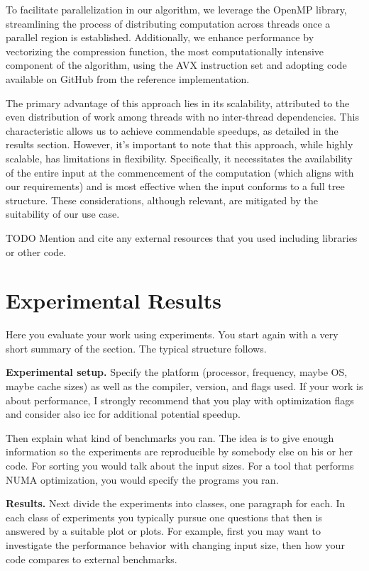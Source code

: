 \documentclass[letterpaper]{article}
\newcommand{\mypar}[1]{{\bf #1.}}
\begin{document}
To facilitate parallelization in our algorithm, we leverage the OpenMP library, streamlining the process of distributing computation across threads once a parallel region is established. Additionally, we enhance performance by vectorizing the compression function, the most computationally intensive component of the algorithm, using the AVX instruction set and adopting code available on GitHub from the reference implementation.

The primary advantage of this approach lies in its scalability, attributed to the even distribution of work among threads with no inter-thread dependencies. This characteristic allows us to achieve commendable speedups, as detailed in the results section. However, it's important to note that this approach, while highly scalable, has limitations in flexibility. Specifically, it necessitates the availability of the entire input at the commencement of the computation (which aligns with our requirements) and is most effective when the input conforms to a full tree structure. These considerations, although relevant, are mitigated by the suitability of our use case.

TODO Mention and cite any external resources that you used including libraries or other code.

\section{Experimental Results}\label{sec:exp}

Here you evaluate your work using experiments. You start again with a
very short summary of the section. The typical structure follows.

\mypar{Experimental setup} Specify the platform (processor, frequency, maybe OS, maybe cache sizes)
as well as the compiler, version, and flags used. If your work is about performance,
I strongly recommend that you play with optimization flags and consider also icc for additional potential speedup.

Then explain what kind of benchmarks you ran. The idea is to give enough information so the experiments are reproducible by somebody else on his or her code.
For sorting you would talk about the input sizes. For a tool that performs NUMA optimization, you would specify the programs you ran.

\mypar{Results}
Next divide the experiments into classes, one paragraph for each. In each class of experiments you typically pursue one questions that then is answered by a suitable plot or plots. For example, first you may want to investigate the performance behavior with changing input size, then how your code compares to external benchmarks.
\end{document}
